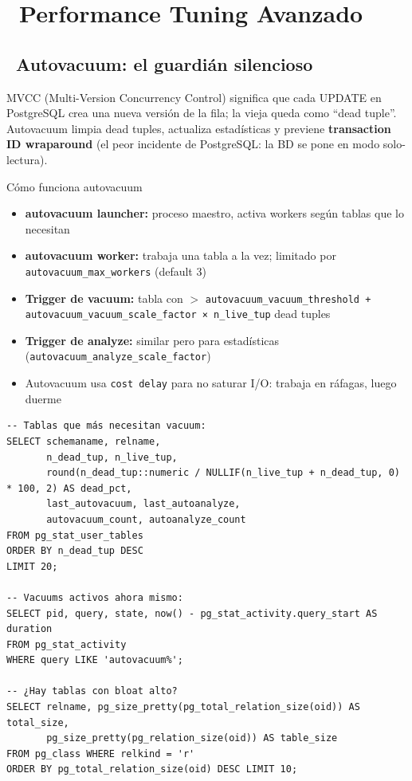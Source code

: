 \chapter[Performance Tuning Avanzado]{~Performance Tuning Avanzado}

\section[Autovacuum: el guardián silencioso]{~Autovacuum: el guardián silencioso}

MVCC (Multi-Version Concurrency Control) significa que cada UPDATE en PostgreSQL crea una nueva versión de la fila; la vieja queda como ``dead tuple''.
Autovacuum limpia dead tuples, actualiza estadísticas y previene \textbf{transaction ID wraparound} (el peor incidente de PostgreSQL: la BD se pone en modo solo-lectura).

\begin{teoriabox}{Cómo funciona autovacuum}
\begin{itemize}
  \item \textbf{autovacuum launcher:} proceso maestro, activa workers según tablas que lo necesitan
  \item \textbf{autovacuum worker:} trabaja una tabla a la vez; limitado por \texttt{autovacuum\_max\_workers} (default 3)
  \item \textbf{Trigger de vacuum:} tabla con $>$ \texttt{autovacuum\_vacuum\_threshold + autovacuum\_vacuum\_scale\_factor × n\_live\_tup} dead tuples
  \item \textbf{Trigger de analyze:} similar pero para estadísticas (\texttt{autovacuum\_analyze\_scale\_factor})
  \item Autovacuum usa \texttt{cost delay} para no saturar I/O: trabaja en ráfagas, luego duerme
\end{itemize}
\end{teoriabox}

\begin{lstlisting}[caption={Diagnosticar estado de autovacuum}]
-- Tablas que más necesitan vacuum:
SELECT schemaname, relname,
       n_dead_tup, n_live_tup,
       round(n_dead_tup::numeric / NULLIF(n_live_tup + n_dead_tup, 0) * 100, 2) AS dead_pct,
       last_autovacuum, last_autoanalyze,
       autovacuum_count, autoanalyze_count
FROM pg_stat_user_tables
ORDER BY n_dead_tup DESC
LIMIT 20;

-- Vacuums activos ahora mismo:
SELECT pid, query, state, now() - pg_stat_activity.query_start AS duration
FROM pg_stat_activity
WHERE query LIKE 'autovacuum%';

-- ¿Hay tablas con bloat alto?
SELECT relname, pg_size_pretty(pg_total_relation_size(oid)) AS total_size,
       pg_size_pretty(pg_relation_size(oid)) AS table_size
FROM pg_class WHERE relkind = 'r'
ORDER BY pg_total_relation_size(oid) DESC LIMIT 10;
\end{lstlisting}


